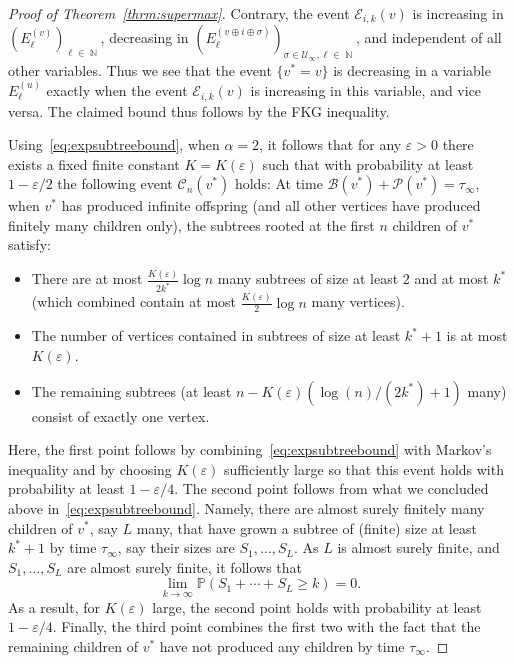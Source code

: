 \documentclass[11pt]{article}
\numberwithin{equation}{section}
\DeclareMathOperator{\N}{\mathbb{N}} %
\renewcommand{\P}{\mathbb{P}} %
\newcommand{\eps}{\varepsilon} %
\newcommand{\be}{\begin{equation}}
\newcommand{\ee}{\end{equation}}
\def\cB{{\mathcal B}}
\def\cP{{\mathcal P}}
\def\cU{{\mathcal U}}
\theoremstyle{definition}
\begin{document}
\begin{proof}[Proof of Theorem~\ref{thrm:supermax}]
{    Contrary, the event $\mathcal{E}_{i,k}(v)$ is increasing in $(E^{(v)}_{\ell})_{\ell \in \N}$, decreasing in $(E^{(v\oplus i \oplus \sigma)}_{\ell})_{\sigma \in \cU_\infty, \ell \in \N}$, and independent of all other variables. Thus we see that the event $\{v^* = v \}$ is decreasing in a variable $E^{(u)}_\ell$ exactly when the event $\mathcal{E}_{i,k}(v)$ is increasing in this variable, and vice versa. The claimed bound thus follows by the FKG inequality.
    }
    
    Using~\eqref{eq:expsubtreebound}, when $\alpha=2$, it follows that for any $\eps>0$ there exists a fixed finite constant $K=K(\eps)$ such that with probability at least $1-\eps/2$ the following event $\mathcal C_n(v^*)$ holds: At time $\cB(v^*) +\cP(v^*)=\tau_\infty$, when $v^*$ has produced infinite offspring (and all other vertices have produced finitely many children only), the subtrees rooted at the first $n$ children of $v^*$ satisfy: 
    \begin{itemize}
        \item There are at most $\frac{K(\eps)}{2k^*}\log n$ many  subtrees of size at least $2$ and at most $k^*$ (which combined contain at most $\frac{K(\eps)}{2}\log n$ many vertices).
        \item The number of vertices contained in subtrees of size at least $k^*+1$ is at most $K(\eps)$.
        \item The remaining subtrees (at least $n-K(\eps)(\log (n)/(2 k^*)+1)$ many) consist of exactly one vertex.
    \end{itemize}
    Here, the first point follows by combining~\eqref{eq:expsubtreebound} with Markov's inequality and by choosing $K(\eps)$ sufficiently large so that this event holds with probability at least $1-\eps/4$. The second point follows from what we concluded above in~\eqref{eq:expsubtreebound}. Namely, there are almost surely finitely many children of $v^*$, say $L$ many, that have grown a subtree of (finite) size at least $k^*+1$ by time $\tau_\infty$, say their sizes are $S_1,\ldots, S_L$. As $L$ is almost surely finite, and $S_1, \ldots, S_L$ are almost surely finite, it follows that 
    \be 
    \lim_{k\to\infty}\P(S_1+\cdots +S_L\geq k)=0. 
    \ee 
    As a result, for $K(\eps)$ large, the second point holds with probability at least $1-\eps/4$. Finally, the third point combines the first two with the fact that the remaining children of $v^*$ have not produced any children by time $\tau_\infty$.  
    

\end{proof}
\end{document}
